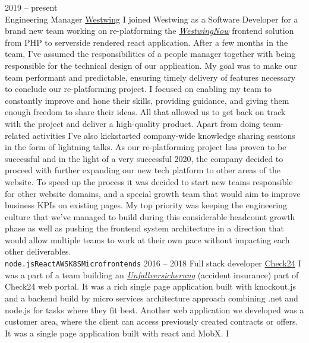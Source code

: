 \documentclass[9pt]{developercv} %
\begin{document}
\begin{entrylist}
	\entry
		{2019 -- present\\}
		{Engineering Manager}
		{{\href{https://www.westwingnow.de/}{Westwing}}}
		{I joined Westwing as a Software Developer for a brand new team working on re-platforming the {\em {\href{https://www.westwingnow.de/}{WestwingNow}}} 
		frontend solution from PHP to serverside rendered react
		application. After a few months in the team, I've assumed the responsibilities of a people manager together with being responsible for the technical 
		design of our application. My goal was to make our team performant and predictable, ensuring timely delivery of features necessary to conclude our 
		re-platforming project.  I focused on enabling my team to constantly improve and hone their skills, providing guidance, and giving them enough freedom 
		to share their ideas. All that allowed us to get back on track with the project and deliver a high-quality product. Apart from doing team-related 
		activities I've also kickstarted company-wide knowledge sharing sessions in the form of lightning talks. As our re-platforming project has proven to 
		be successful and in the light of a very successful 2020, the company decided to proceed with further expanding our new tech platform to other areas of 
		the website. To speed up the process it was decided to start new teams responsible for other website domains, and a special growth team that would aim to improve business KPIs on existing pages.
		My top priority was keeping the engineering culture that we've managed to build during this considerable headcount growth phase as well as pushing the 
		frontend system architecture in a direction that would allow multiple teams to work at their own pace without impacting each other deliverables.
		\\ \texttt{node.js}\slashsep\texttt{React}\slashsep\texttt{AWS}\slashsep\texttt{K8S}\slashsep\texttt{Microfrontends}}
	\entry
		{2016 -- 2018}
		{Full stack developer}
		{{\href{https://www.check24.de/}{Check24}}}
		{I was a part of a team building an {\em {\href{https://www.check24.de/unfallversicherung/}{Unfallversicherung}}} (accident insurance) part of Check24 web portal. 
		It was a rich single page application built with knockout.js and a
		backend build by micro services architecture approach combining .net and node.js for tasks where they fit best. Another web application we developed was 
		a customer area, where the client can access previously created contracts or offers. It was a single page application built with react and MobX. I 
}
\end{entrylist}
\end{document}
